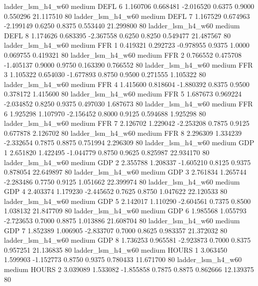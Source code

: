      ladder_lsm_h4_w60     medium     DEFL                 6  1.160706 0.668481 -2.016520 0.6375 0.9000  0.550296   21.117510 80
     ladder_lsm_h4_w60     medium     DEFL                 7  1.167529 0.674963 -2.199149 0.6250 0.8375  0.553440   21.299800 80
     ladder_lsm_h4_w60     medium     DEFL                 8  1.174626 0.683395 -2.367558 0.6250 0.8250  0.549477   21.487567 80
     ladder_lsm_h4_w60     medium      FFR                 1  0.419321 0.292723 -0.978955 0.9375 1.0000  0.069755    0.419321 80
     ladder_lsm_h4_w60     medium      FFR                 2  0.766552 0.475708 -1.405137 0.9000 0.9750  0.163390    0.766552 80
     ladder_lsm_h4_w60     medium      FFR                 3  1.105322 0.654030 -1.677893 0.8750 0.9500  0.271555    1.105322 80
     ladder_lsm_h4_w60     medium      FFR                 4  1.415600 0.818604 -1.880392 0.8375 0.9500  0.378172    1.415600 80
     ladder_lsm_h4_w60     medium      FFR                 5  1.687673 0.969224 -2.034852 0.8250 0.9375  0.497030    1.687673 80
     ladder_lsm_h4_w60     medium      FFR                 6  1.925298 1.107970 -2.156452 0.8000 0.9125  0.594688    1.925298 80
     ladder_lsm_h4_w60     medium      FFR                 7  2.126702 1.229042 -2.253208 0.7875 0.9125  0.677878    2.126702 80
     ladder_lsm_h4_w60     medium      FFR                 8  2.296309 1.334239 -2.332654 0.7875 0.8875  0.751994    2.296309 80
     ladder_lsm_h4_w60     medium      GDP                 1  2.651820 1.422495 -1.044779 0.8750 0.9625  0.825987   22.934170 80
     ladder_lsm_h4_w60     medium      GDP                 2  2.355788 1.208337 -1.605210 0.8125 0.9375  0.878054   22.649897 80
     ladder_lsm_h4_w60     medium      GDP                 3  2.761834 1.265744 -2.283486 0.7750 0.9125  1.051662   22.399974 80
     ladder_lsm_h4_w60     medium      GDP                 4  2.403374 1.179230 -2.445652 0.7625 0.8750  1.047622   22.120533 80
     ladder_lsm_h4_w60     medium      GDP                 5  2.142017 1.110290 -2.604561 0.7375 0.8500  1.038132   21.847709 80
     ladder_lsm_h4_w60     medium      GDP                 6  1.985568 1.055793 -2.723653 0.7000 0.8875  1.013886   21.608704 80
     ladder_lsm_h4_w60     medium      GDP                 7  1.852389 1.006905 -2.833707 0.7000 0.8625  0.983357   21.372032 80
     ladder_lsm_h4_w60     medium      GDP                 8  1.736253 0.965581 -2.923873 0.7000 0.8375  0.957251   21.136835 80
     ladder_lsm_h4_w60     medium    HOURS                 1  3.063450 1.599903 -1.152773 0.8750 0.9375  0.780433   11.671700 80
     ladder_lsm_h4_w60     medium    HOURS                 2  3.039089 1.533082 -1.855858 0.7875 0.8875  0.862666   12.139375 80
